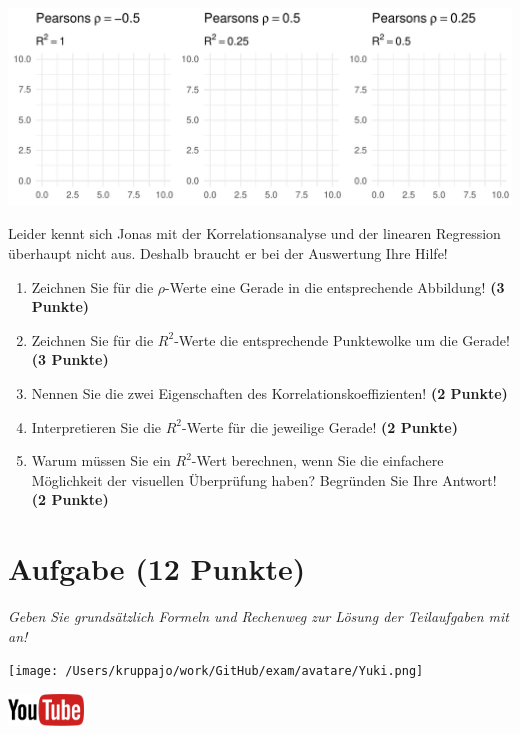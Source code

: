 \documentclass[a4paper, 9pt]{scrartcl}\usepackage[]{graphicx}\usepackage[]{xcolor}
\makeatletter
\def\maxwidth{ %
  \ifdim\Gin@nat@width>\linewidth
    \linewidth
  \else
    \Gin@nat@width
  \fi
}
\makeatother
\begin{document}
{\centering \includegraphics[width=\maxwidth]{img/correlation-01-1} 

}




\vspace{2Ex}

Leider kennt sich Jonas mit der Korrelationsanalyse und der linearen Regression überhaupt nicht aus. Deshalb braucht er bei der Auswertung Ihre Hilfe!

\begin{enumerate}
\item Zeichnen Sie für die $\rho$-Werte eine Gerade in die entsprechende Abbildung! \textbf{(3 Punkte)}
\item Zeichnen Sie für die $R^2$-Werte die entsprechende Punktewolke um die Gerade! \textbf{(3 Punkte)}
\item Nennen Sie die zwei Eigenschaften des Korrelationskoeffizienten! \textbf{(2 Punkte)}
\item Interpretieren Sie die $R^2$-Werte für die jeweilige Gerade! \textbf{(2 Punkte)}
\item Warum müssen Sie ein $R^2$-Wert berechnen, wenn Sie die einfachere Möglichkeit der visuellen Überprüfung haben? Begründen Sie Ihre Antwort! \textbf{(2 Punkte)}
\end{enumerate}
 
\clearpage

\section{Aufgabe \hfill (12 Punkte)}

\textit{Geben Sie grundsätzlich Formeln und Rechenweg zur Lösung der Teilaufgaben mit an!} \\[1Ex]
 

 
\begin{minipage}[t]{0.5\textwidth}
\texttt{[image: /Users/kruppajo/work/GitHub/exam/avatare/Yuki.png]}
\end{minipage}
\begin{minipage}[t]{0.5\textwidth}
\hfill
\href{https://youtu.be/2QJa19ZwLls}{\includegraphics[width = 2cm]{img/youtube}}
\end{minipage}
\vspace{1ex}
\end{document}
